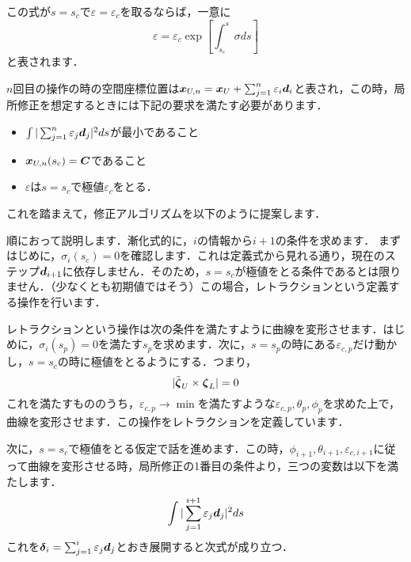 \documentclass[16pt]{jsarticle}
\begin{document}
		この式が$ s = s_c $で$ \varepsilon=\varepsilon_c $を取るならば，一意に
		\begin{equation}\label{eq:vareq}
			\varepsilon = \varepsilon_c \exp \left[ \int_{s_c}^{s} \sigma ds \right]
		\end{equation}
		と表されます．
		
		$ n $回目の操作の時の空間座標位置は$ \boldsymbol{x}_{U,n} = \boldsymbol{x}_U + \sum_{j=1}^{n} \varepsilon_i \boldsymbol{d}_i$と表され，この時，局所修正を想定するときには下記の要求を満たす必要があります．
		\begin{itemize}
			\item $ \int |\sum_{j=1}^{n} \varepsilon_j \boldsymbol{d}_j|^2 ds  $が最小であること
			\item $ \boldsymbol{x}_{U,n}(s_c) = \boldsymbol{C} $であること
			\item $ \varepsilon $は$ s=s_c $で極値$ \varepsilon_c $をとる．
		\end{itemize}
		これを踏まえて，修正アルゴリズムを以下のように提案します．
		
		順におって説明します．漸化式的に，$i$の情報から$ i+1 $の条件を求めます．
		まずはじめに，$ \sigma_i(s_c)=0 $を確認します．これは定義式から見れる通り，現在のステップ$ \boldsymbol{d}_{i+1} $に依存しません．そのため，$ s=s_c $が極値をとる条件であるとは限りません．（少なくとも初期値ではそう）この場合，レトラクションという定義する操作を行います．
		
		レトラクションという操作は次の条件を満たすように曲線を変形させます．はじめに，$ \sigma_i(s_p) =0$を満たす$ s_p $を求めます．次に，$ s=s_p $の時にある$ \varepsilon_{c,p} $だけ動かし，$ s=s_c $の時に極値をとるようにする．つまり，
		\begin{equation}\label{eq:CylinderEq}
			|\tilde{\boldsymbol{\zeta}}_U \times \boldsymbol{\zeta}_L| = 0
		\end{equation}
		これを満たすもののうち，$ \varepsilon_{c,p} \rightarrow \min $を満たすような$ \varepsilon_{c,p},\theta_p,\phi_p $を求めた上で，曲線を変形させます．この操作をレトラクションを定義しています．
		
		次に，$ s=s_c $で極値をとる仮定で話を進めます．この時，$ \phi_{i+1},\theta_{i+1},\varepsilon_{c,i+1} $に従って曲線を変形させる時，局所修正の1番目の条件より，三つの変数は以下を満たします．
		\begin{equation}\label{eq:FirstAmendEq}
			 \int |\sum_{j=1}^{i+1} \varepsilon_j \boldsymbol{d}_j|^2 ds
		\end{equation}
		これを$ \boldsymbol{\delta}_i =  \sum_{j=1}^{i} \varepsilon_j \boldsymbol{d}_j$とおき展開すると次式が成り立つ．
		
\end{document}
